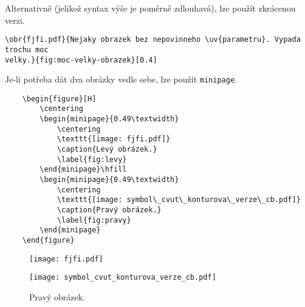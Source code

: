 \documentclass{cygclanek}
\begin{document}
Alternativně (jelikož syntax výše je poměrně zdlouhavá), lze použít zkrácenou verzi.
\begin{verbatim}
\obr{fjfi.pdf}{Nejaky obrazek bez nepovinneho \uv{parametru}. Vypada trochu moc
velky.}{fig:moc-velky-obrazek}[0.4]
\end{verbatim}
% 
% 
% 
% 
% 
% 
Je-li potřeba dát dva obrázky vedle sebe, lze použít \verb|minipage|.
\begin{verbatim}
    \begin{figure}[H]
        \centering
        \begin{minipage}{0.49\textwidth}
            \centering
            \texttt{[image: fjfi.pdf]}
            \caption{Levý obrázek.}
            \label{fig:levy}
        \end{minipage}\hfill
        \begin{minipage}{0.49\textwidth}
            \centering
            \texttt{[image: symbol\_cvut\_konturova\_verze\_cb.pdf]}
            \caption{Pravý obrázek.}
            \label{fig:pravy}
        \end{minipage}
    \end{figure}
\end{verbatim}

\begin{figure}[H]
    \centering
    \begin{minipage}{0.49\textwidth}
        \centering
        \texttt{[image: fjfi.pdf]}
        \caption{Levý obrázek.}
        \label{fig:levy}
    \end{minipage}\hfill
    \begin{minipage}{0.49\textwidth}
        \centering
        \texttt{[image: symbol\_cvut\_konturova\_verze\_cb.pdf]}
        \caption{Pravý obrázek.}
        \label{fig:pravy}
    \end{minipage}
\end{figure}
\end{document}
